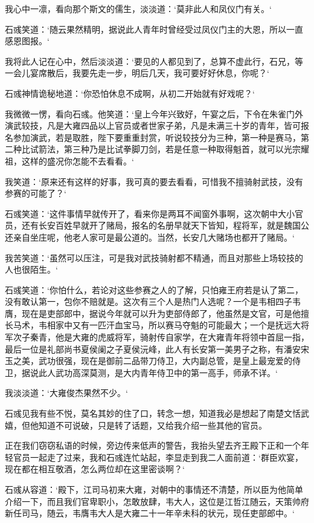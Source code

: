 我心中一凛，看向那个斯文的儒生，淡淡道：‘莫非此人和凤仪门有关。‘

石彧笑道：‘随云果然精明，据说此人青年时曾经受过凤仪门主的大恩，所以一直感恩图报。‘

我将此人记在心中，然后淡淡道：‘要见的人都见到了，总算不虚此行，石兄，等一会儿宴席散后，我要先走一步，明后几天，我可要好好休息，你呢？‘

石彧神情诡秘地道：‘你恐怕休息不成啊，从初二开始就有好戏呢？‘

我微微一愣，看向石彧。他笑道：‘皇上今年兴致好，午宴之后，下令在朱雀门外演武较技，凡是大雍四品以上官员或者世家子弟，凡是未满三十岁的青年，皆可报名参加演武，若是取胜，陛下要重重封赏，听说较技分为三种，第一种是赛马，第二种比试箭法，第三种乃是比试拳脚刀剑，若是任意一种取得魁首，就可以光宗耀祖，这样的盛况你怎能不去看看。‘

我笑道：‘原来还有这样的好事，我可真的要去看看，可惜我不擅骑射武技，没有参赛的可能了？‘

石彧笑道：‘这件事情早就传开了，看来你是两耳不闻窗外事啊，这次朝中大小官员，还有长安百姓早就开了赌局，报名的名册早就天下皆知，程将军，就是魏国公还亲自坐庄呢，他老人家可是最公道的。当然，长安几大赌场也都开了赌局。‘

我苦笑道：‘虽然可以压注，可是我对武技骑射都不精通，而且对那些上场较技的人也很陌生。‘

石彧笑道：‘你怕什么，若论对这些参赛之人的了解，只怕雍王府若是认了第二，没有敢认第一，包你不赔就是。这次有三个人是热门人选呢？一个是韦相四子韦膺，现在是吏部郎中，据说今年就可以升为吏部侍郎了，他虽然是文官，可是他擅长马术，韦相家中又有一匹汗血宝马，所以赛马夺魁的可能最大；一个是抚远大将军次子秦青，他是大雍的虎威将军，骑射传自家学，在大雍青年将领中首屈一指，最后一位是礼部尚书夏侯阑之子夏侯沅峰，此人有长安第一美男子之称，有潘安宋玉之美，武功很强，现在是御前二品带刀侍卫，大内副总管，是皇上最宠爱的侍卫，据说此人武功高深莫测，是大内青年侍卫中的第一高手，师承不详。‘

我淡淡道：‘大雍俊杰果然不少。‘

石彧见我有些不悦，莫名其妙的住了口，转念一想，知道我必是想起了南楚文恬武嬉，但他知道不可说破，只是转了话题，又给我介绍一些其他的官员。

正在我们窃窃私语的时候，旁边传来低声的警告，我抬头望去齐王殿下正和一个年轻官员一起走了过来，我和石彧连忙站起，李显走到我二人面前道：‘群臣欢宴，现在都在相互敬酒，怎么两位却在这里密谈啊？‘

石彧从容道：‘殿下，江司马初来大雍，对朝中的事情还不清楚，所以臣为他简单介绍一下，而且我们官卑职小，怎敢放肆，韦大人，这位是江哲江随云，天策帅府新任司马，随云，韦膺韦大人是大雍二十一年辛未科的状元，现任吏部郎中。‘

